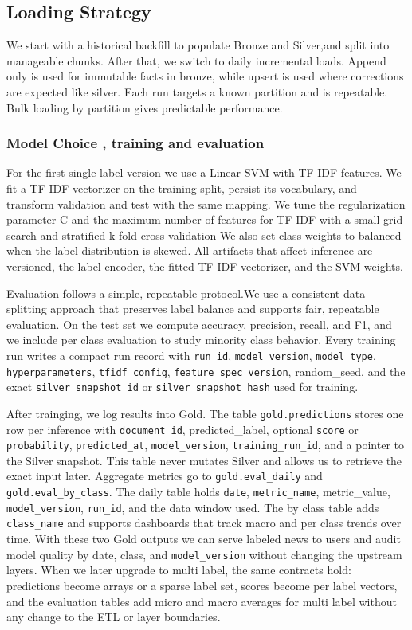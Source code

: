 \subsection{Loading Strategy}
We start with a historical backfill to populate Bronze and Silver,and split into manageable chunks. After that, we switch to daily incremental loads. Append only is used for immutable facts in bronze, while upsert is used where corrections are expected like silver. Each run targets a known partition and is repeatable. Bulk loading by partition gives predictable performance.


\subsubsection{Model Choice , training and evaluation}
For the first single label version we use a Linear SVM with TF-IDF features. We fit a TF-IDF vectorizer on the training split, persist its vocabulary, and transform validation and test with the same mapping. We tune the regularization parameter C and the maximum number of features for TF-IDF with a small grid search and stratified k-fold cross validation  We also set class weights to balanced when the label distribution is skewed. All artifacts that affect inference are versioned, the label encoder, the fitted TF-IDF vectorizer, and the SVM weights.

\smallbreak
Evaluation follows a simple, repeatable protocol.We use a consistent data splitting approach that preserves label balance and supports fair, repeatable evaluation. On the test set we compute accuracy,  precision,  recall, and  F1, and we include per class evaluation to study minority class behavior.
Every training run writes a compact run record with \texttt{run\_id}, \texttt{model\_version}, \texttt{model\_type}, \texttt{hyperparameters}, \texttt{tfidf\_config}, \texttt{feature\_spec\_version}, random\_seed, and the exact \texttt{silver\_snapshot\_id} or \texttt{silver\_snapshot\_hash} used for training.
\smallbreak



After trainging, we log results into Gold. The table \texttt{gold.predictions} stores one row per inference with \texttt{document\_id}, predicted\_label, optional \texttt{score} or \texttt{probability}, \texttt{predicted\_at}, \texttt{model\_version}, \texttt{training\_run\_id}, and a pointer to the Silver snapshot. This table never mutates Silver and allows us to retrieve the exact input later. Aggregate metrics go to \texttt{gold.eval\_daily} and \texttt{gold.eval\_by\_class}. The daily table holds \texttt{date}, \texttt{metric\_name}, metric\_value, \texttt{model\_version}, \texttt{run\_id}, and the data window used. The by class table adds \texttt{class\_name} and supports dashboards that track macro and per class trends over time. With these two Gold outputs we can serve labeled news to users and audit model quality by date, class, and \texttt{model\_version} without changing the upstream layers. When we later upgrade to multi label, the same contracts hold: predictions become arrays or a sparse label set, scores become per label vectors, and the evaluation tables add micro and macro averages for multi label without any change to the ETL or layer boundaries.

